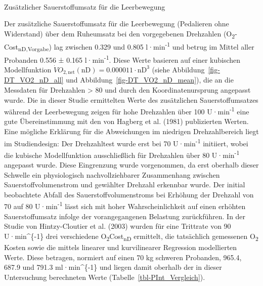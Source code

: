 \documentclass[
  letterpaper,
  DIV=11]{scrartcl}
\makeatletter
\let\oldparagraph\paragraph
\renewcommand{\paragraph}{
    \@ifstar
      \xxxParagraphStar
      \xxxParagraphNoStar
  }
\newcommand{\xxxParagraphStar}[1]{\oldparagraph*{#1}\mbox{}}
\newcommand{\xxxParagraphNoStar}[1]{\oldparagraph{#1}\mbox{}}
\makeatother
\begin{document}
\paragraph{Zusätzlicher Sauerstoffumsatz für die
Leerbewegung}\label{zusuxe4tzlicher-sauerstoffumsatz-fuxfcr-die-leerbewegung}

Der zusätzliche Sauerstoffumsatz für die Leerbewegung (Pedalieren ohne
Widerstand) über dem Ruheumsatz bei den vorgegebenen Drehzahlen
(O\textsubscript{2}-Cost\textsubscript{nD,Vorgabe}) lag zwischen 0.329
und 0.805 l·min\textsuperscript{-1} und betrug im Mittel aller Probanden
0.556 ± 0.165 l·min\textsuperscript{-1}. Diese Werte basieren auf einer
kubischen Modellfunktion
\(\dot{V}O_{2,\text{net}}(\text{nD}) = 0.000011 \cdot \text{nD}^3\)
(siehe Abbildung~\ref{fig-DT_VO2_nD_all} und
Abbildung~\ref{fig-DT_VO2_nD_mean}), die an die Messdaten für Drehzahlen
\textgreater{} 80 und durch den Koordinatenursprung angepasst wurde. Die
in dieser Studie ermittelten Werte des zusätzlichen Sauerstoffumsatzes
während der Leerbewegung zeigen für hohe Drehzahlen über 100
U·min\textsuperscript{-1} eine gute Übereinstimmung mit den von Hagberg
et al. (1981) publizierten Werten. Eine mögliche Erklärung für die
Abweichungen im niedrigen Drehzahlbereich liegt im Studiendesign: Der
Drehzahltest wurde erst bei 70 U·min\textsuperscript{-1} initiiert,
wobei die kubische Modellfunktion ausschließlich für Drehzahlen über 80
U·min\textsuperscript{-1} angepasst wurde. Diese Eingrenzung wurde
vorgenommen, da erst oberhalb dieser Schwelle ein physiologisch
nachvollziehbarer Zusammenhang zwischen Sauerstoffvolumenstrom und
gewählter Drehzahl erkennbar wurde. Der initial beobachtete Abfall des
Sauerstoffvolumenstroms bei Erhöhung der Drehzahl von 70 auf 80
U·min\textsuperscript{-1} lässt sich mit hoher Wahrscheinlichkeit auf
einen erhöhten Sauerstoffumsatz infolge der vorangegangenen Belastung
zurückführen. In der Studie von Hintzy-Cloutier et al. (2003) wurden für
eine Trittrate von 90 U·min\^{}\{-1\} drei verschiedene
O\textsubscript{2}Cost\textsubscript{nD} ermittelt, die tatsächlich
gemessenen O\textsubscript{2} Kosten sowie die mittels linearer und
kurvilinearer Regression modellierten Werte. Diese betragen, normiert
auf einen 70 kg schweren Probanden, 965.4, 687.9 und 791.3
ml·min\^{}\{-1\} und liegen damit oberhalb der in dieser Untersuchung
berechneten Werte (Tabelle~\ref{tbl-PInt_Vergleich}).
\end{document}
